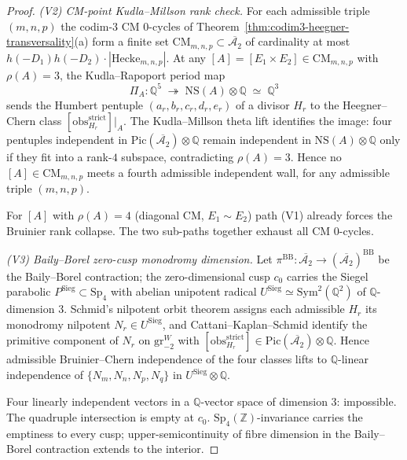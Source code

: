 \begin{proof}
\emph{(V2) CM-point Kudla--Millson rank check.} For each admissible
triple $(m,n,p)$ the codim-$3$ CM $0$-cycles of
Theorem~\textup{\ref{thm:codim3-heegner-transversality}}(a) form a
finite set $\mathrm{CM}_{m,n,p}\subset\overline{\mathcal A_2}$ of
cardinality at most $h(-D_1)h(-D_2)\cdot|\mathrm{Hecke}_{m,n,p}|$.
At any $[A]=[E_1\times E_2]\in\mathrm{CM}_{m,n,p}$ with $\rho(A)=3$,
the Kudla--Rapoport period map
\cite[\S 3]{KudlaRapoport2000}
\[
\Pi_A\colon\mathbb Q^5\;\twoheadrightarrow\;\mathrm{NS}(A)\otimes\mathbb Q
\;\simeq\;\mathbb Q^3
\]
sends the Humbert pentuple $(a_r,b_r,c_r,d_r,e_r)$ of a divisor
$H_r$ to the Heegner--Chern class $[\mathrm{obs}^{\mathrm{strict}}_{H_r}]|_A$.
The Kudla--Millson theta lift \cite[Thm.~1.2]{KudlaMillson1990}
identifies the image: four pentuples independent in
$\mathrm{Pic}(\overline{\mathcal A_2})\otimes\mathbb Q$ remain
independent in $\mathrm{NS}(A)\otimes\mathbb Q$ only if they fit
into a rank-$4$ subspace, contradicting $\rho(A)=3$. Hence no
$[A]\in\mathrm{CM}_{m,n,p}$ meets a fourth admissible independent
wall, for any admissible triple $(m,n,p)$.

For $[A]$ with $\rho(A)=4$ (diagonal CM, $E_1\sim E_2$) path (V1)
already forces the Bruinier rank collapse. The two sub-paths
together exhaust all CM $0$-cycles.

\emph{(V3) Baily--Borel zero-cusp monodromy dimension.} Let
$\pi^{\mathrm{BB}}\colon\overline{\mathcal A_2}\to(\overline{\mathcal A_2})^{\mathrm{BB}}$
be the Baily--Borel contraction; the zero-dimensional cusp $c_0$
carries the Siegel parabolic $P^{\mathrm{Sieg}}\subset\mathrm{Sp}_4$
with abelian unipotent radical
$U^{\mathrm{Sieg}}\simeq\mathrm{Sym}^2(\mathbb Q^2)$
of $\mathbb Q$-dimension $3$. Schmid's nilpotent orbit theorem
\cite[\S 5, Thm.~5.13]{Schmid1973} assigns each admissible $H_r$
its monodromy nilpotent $N_r\in U^{\mathrm{Sieg}}$, and
Cattani--Kaplan--Schmid
\cite[Cor.~3.13]{CattaniKaplanSchmid1986} identify the primitive
component of $N_r$ on $\mathrm{gr}^W_{-2}$ with
$[\mathrm{obs}^{\mathrm{strict}}_{H_r}]\in\mathrm{Pic}(\overline{\mathcal A_2})\otimes\mathbb Q$.
Hence admissible Bruinier--Chern independence of the four classes
lifts to $\mathbb Q$-linear independence of $\{N_m,N_n,N_p,N_q\}$ in
$U^{\mathrm{Sieg}}\otimes\mathbb Q$.

Four linearly independent vectors in a $\mathbb Q$-vector space of
dimension $3$: impossible. The quadruple intersection is empty at
$c_0$. $\mathrm{Sp}_4(\mathbb Z)$-invariance carries the emptiness
to every cusp; upper-semicontinuity of fibre dimension in the
Baily--Borel contraction extends to the interior.


\end{proof}
